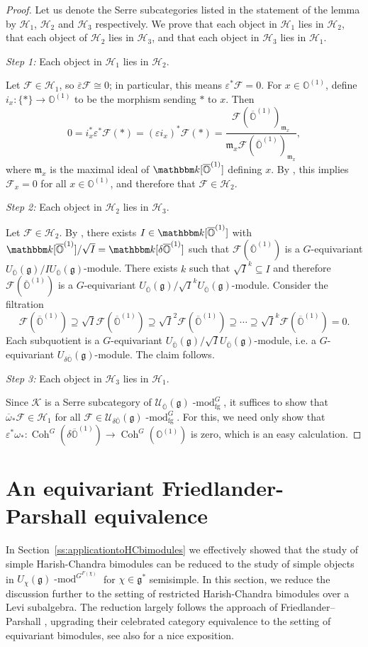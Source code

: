 \documentclass[twoside,12pt,reqno]{amsart}
\theoremstyle{remark}
\numberwithin{equation}{section}
\def\iso{\cong}
\def\k{{\mathbbm k}}
\def\lmod{\!\operatorname{-mod}}
\def\Coh{\operatorname{Coh}}
\def\o{\overline}
\def\O{{\mathbb O}}
\def\cO{{\overline{\mathbb O}}}
\def\g{{\mathfrak g}}
\def\m{\mathfrak m}
\def\cF{\mathcal{F}}
\def\cK{\mathcal{K}}
\def\U{\mathcal{U}}
\def\H{\mathcal{H}}
\newcommand{\fg}{\operatorname{fg}}
\begin{document}
\begin{proof}
    Let us denote the Serre subcategories listed in the statement of the lemma by $\H_1$, $\H_2$ and $\H_3$ respectively. We prove that each object in $\H_1$ lies in $\H_2$, that each object of $\H_2$ lies in $\H_3$, and that each object in $\H_3$ lies in $\H_1$.

    {\it Step 1:} Each object in  $\H_1$ lies in $\H_2$.

    Let $\cF\in\H_1$, so $\o\varepsilon\cF\iso0$; in particular, this means $\varepsilon^*\cF=0$. For $x\in \O^{(1)}$, define $i_x:\{*\}\to \O^{(1)}$ to be the morphism sending $*$ to $x$. Then $$0=i_x^*\varepsilon^*\cF(*)=(\varepsilon i_x)^*\cF(*)=\frac{\cF(\cO^{(1)})_{\m_x}}{\m_x\cF(\cO^{(1)})_{\m_x}},$$ where $\m_x$ is the maximal ideal of $\k[\cO^{(1)}]$ defining $x$. By \cite[29.5.3]{St}, this implies $\cF_x=0$ for all $x\in\O^{(1)}$, and therefore that $\cF\in \H_2$.

    {\it Step 2:} Each object in  $\H_2$ lies in $\H_3$.
    
    Let $\cF\in\H_2$. By \cite[29.5.4]{St}, there exists $I\in \k[\cO^{(1)}]$ with $\k[\cO^{(1)}]/\sqrt{I}=\k[\delta\cO^{(1)}]$ such that $\cF(\cO^{(1)})$ is a $G$-equivariant $U_\cO(\g)/I U_\cO(\g)$-module. There exists $k$ such that $\sqrt{I}^k\subseteq I$ and therefore $\cF(\cO^{(1)})$ is a $G$-equivariant $U_\cO(\g)/\sqrt{I}^k U_\cO(\g)$-module. Consider the filtration $$\cF(\cO^{(1)})\supseteq \sqrt{I}\cF(\cO^{(1)})\supseteq \sqrt{I}^2\cF(\cO^{(1)})\supseteq \cdots\supseteq \sqrt{I}^k\cF(\cO^{(1)})=0.$$  Each subquotient is a $G$-equivariant $U_\cO(\g)/\sqrt{I} U_\cO(\g)$-module, i.e. a $G$-equivariant $U_{\delta\cO}(\g)$-module. The claim follows.
    
    {\it Step 3:} Each object in  $\H_3$ lies in $\H_1$.

    Since $\cK$ is a Serre subcategory of $\U_\cO(\g)\lmod^G_{\fg}$, it suffices to show that $\o\omega_*\cF\in\H_1$ for all $\cF\in\U_{\delta\cO}(\g)\lmod^G_{\fg}$. For this, we need only show that $\varepsilon^*\omega_*:\Coh^G(\delta\cO^{(1)})\to \Coh^G(\O^{(1)})$ is zero, which is an easy calculation. 
\end{proof}

\section{An equivariant Friedlander-Parshall equivalence}
\label{S:centralreductions}

In Section~\ref{ss:applicationtoHCbimodules} we effectively showed that the study of simple Harish-Chandra bimodules can be reduced to the study of simple objects in $U_\chi(\g)\lmod^{G^{F(\chi)}}$ for $\chi\in\g^*$ semisimple. In this section, we reduce the discussion further to the setting of restricted Harish-Chandra bimodules over a Levi subalgebra. The reduction largely follows the approach of Friedlander--Parshall \cite[Theorem~3.2]{FP},  upgrading their celebrated category equivalence to the setting of equivariant bimodules, see also \cite[]{JaLA} for a nice exposition.
\end{document}
